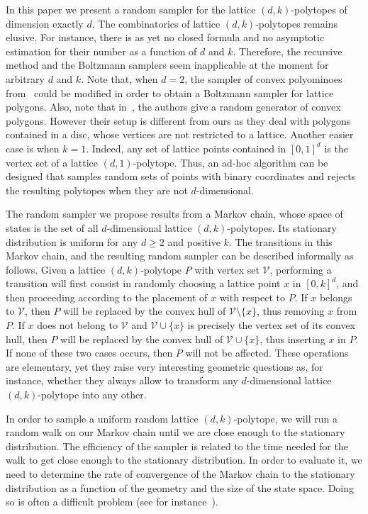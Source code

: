 \documentclass[a4paper,10pt]{article}
\begin{document}
In this paper we present a random sampler for the lattice $(d,k)$-polytopes of dimension exactly $d$. The combinatorics of lattice $(d,k)$-polytopes remains elusive. For instance, there is as yet no closed formula and no asymptotic estimation for their number as a function of $d$ and $k$. Therefore, the recursive method and the Boltzmann samplers seem inapplicable at the moment for arbitrary $d$ and $k$. Note that, when $d=2$, the sampler of convex polyominoes from~\cite{bodini2013asymptotic} could be modified in order to obtain a Boltzmann sampler for lattice polygons. Also, note that in~\cite{devillers2014generator}, the authors give a random generator of convex polygons. However their setup is different from ours as they deal with polygons contained in a disc, whose vertices are not restricted to a lattice. Another easier case is when $k=1$. Indeed, any set of lattice points contained in $[0,1]^d$ is the vertex set of a lattice $(d,1)$-polytope. Thus, an ad-hoc algorithm can be designed that samples random sets of points with binary coordinates and rejects the resulting polytopes when they are not $d$-dimensional.

The random sampler we propose results from a Markov chain, whose space of states is the set of all $d$-dimensional lattice $(d,k)$-polytopes. Its stationary distribution is uniform for any $d\geq{2}$ and positive $k$. The transitions in this Markov chain, and the resulting random sampler can be described informally as follows. Given a lattice $(d,k)$-polytope $P$ with vertex set $\mathcal{V}$, performing a transition will first consist in randomly choosing a lattice point $x$ in $[0,k]^d$, and then proceeding according to the placement of $x$ with respect to $P$. If $x$ belongs to $\mathcal{V}$, then $P$ will be replaced by the convex hull of $\mathcal{V}\mathord{\setminus}\{x\}$, thus removing $x$ from $P$. If $x$ does not belong to $\mathcal{V}$ and $\mathcal{V}\cup\{x\}$
is precisely the vertex set of its convex hull, then $P$ will be replaced by the convex hull of $\mathcal{V}\cup\{x\}$, thus inserting $x$ in $P$. If none of these two cases occurs, then $P$ will not be affected. These operations are elementary, yet they raise very interesting geometric questions as, for instance, whether they always allow to transform any $d$-dimensional lattice $(d,k)$-polytope into any other.

In order to sample a uniform random lattice $(d,k)$-polytope, we will run a random walk on our Markov chain until we are close enough to the stationary distribution. The efficiency of the sampler is related to the time needed for the walk to get close enough to the stationary distribution. In order to evaluate it, we need to determine the rate of convergence of the Markov chain to the stationary distribution as a function of the geometry and the size of the state space. Doing so is often a difficult problem (see for instance~\cite{carnino2011random,melanccon2001random}).
\end{document}
